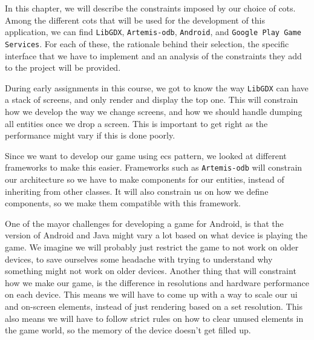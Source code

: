 
In this chapter, we will describe the constraints imposed by our choice of \gls{cots}. Among the different \gls{cots} that will be used for the development of this application, we can find \texttt{LibGDX}, \texttt{Artemis-odb}, \texttt{Android}, and \texttt{Google Play Game Services}. For each of these, the rationale behind their selection, the specific interface that we have to implement and an analysis of the constraints they add to the project will be provided.



During early assignments in this course, we got to know the way \texttt{LibGDX} \citep{libgdx} can have a stack of screens, and only render and display the top one. This will constrain how we develop the way we change screens, and how we should handle dumping all entities once we drop a screen. This is important to get right as the performance might vary if this is done poorly.

Since we want to develop our game using \gls{ecs} pattern, we looked at different frameworks to make this easier. Frameworks such as \texttt{Artemis-odb} \citep{artemis-odb} will constrain our architecture so we have to make components for our entities, instead of inheriting from other classes. It will also constrain us on how we define components, so we make them compatible with this framework.

One of the mayor challenges for developing a game for Android, is that the version of Android and Java might vary a lot based on what device is playing the game. We imagine we will probably just restrict the game to not work on older devices, to save ourselves some headache with trying to understand why something might not work on older devices. Another thing that will constraint how we make our game, is the difference in resolutions and hardware performance on each device. This means we will have to come up with a way to scale our \gls{ui} and on-screen elements, instead of just rendering based on a set resolution. This also means we will have to follow strict rules on how to clear unused elements in the game world, so the memory of the device doesn't get filled up.

